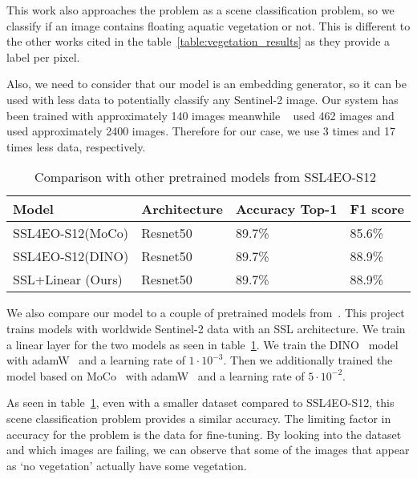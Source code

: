 \documentclass[conference]{IEEEtran}
\begin{document}
    This work also approaches the problem as a scene classification problem, so we classify if an image contains floating aquatic vegetation or not.
    This is different to the other works cited in the table~\ref{table:vegetation_results} as they provide a label per pixel.

    Also, we need to consider that our model is an embedding generator, so it can be used with less data to potentially classify any Sentinel-2 image.
    Our system has been trained with approximately 140 images meanwhile ~\citet{rs12244021} used 462 images and~\citet{rs14133013} used approximately 2400 images.
    Therefore for our case, we use 3 times and 17 times less data, respectively.

    \begin{table}[h!]
        \centering
        \begin{tabular}{ |p{3cm}||p{1.3cm}|p{1.9cm}|p{1cm}|}
            \hline
            Model                                    & Architecture & Accuracy Top-1 & F1 score \\
            \hline
            \hline
            SSL4EO-S12(MoCo)\cite{wang2023ssl4eos12} & Resnet50     & 89.7\%         & 85.6\%   \\
            SSL4EO-S12(DINO)\cite{wang2023ssl4eos12} & Resnet50     & 89.7\%         & 88.9\%   \\
            SSL+Linear (Ours)                        & Resnet50     & 89.7\%         & 88.9\%   \\
            \hline
        \end{tabular}
        \caption{Comparison with other pretrained models from SSL4EO-S12~\cite{wang2023ssl4eos12}}
        \label{tab:vegetation_results_ssl}
    \end{table}

    We also compare our model to a couple of pretrained models from~\citet{wang2023ssl4eos12}.
    This project trains models with worldwide Sentinel-2 data with an SSL architecture.
    We train a linear layer for the two models as seen in table~\ref{tab:vegetation_results_ssl}.
    We train the DINO~\cite{DINO} model with adamW~\cite{loshchilov2019decoupled} and a learning rate of $1\cdot10^{-3}$.
    Then we additionally trained the model based on MoCo~\cite{chen2020mocov2} with adamW~\cite{loshchilov2019decoupled} and a learning rate of $5\cdot10^{-2}$.

    As seen in table~\ref{tab:vegetation_results_ssl}, even with a smaller dataset compared to SSL4EO-S12, this scene classification problem provides a
    similar accuracy.
    The limiting factor in accuracy for the problem is the data for fine-tuning.
    By looking into the dataset and which images are failing, we can observe that some of the images that appear as `no vegetation' actually have some
    vegetation.
\end{document}
